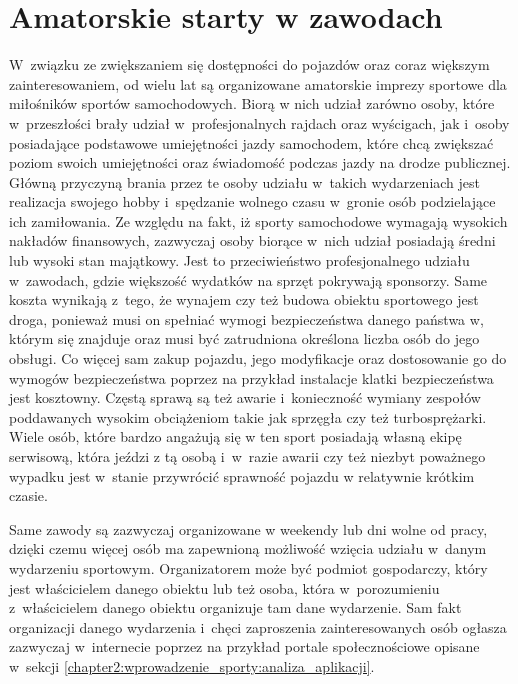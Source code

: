 \documentclass[../Kamil_Kowalewski_Main.tex]{subfiles}
\begin{document}
{    \section{Amatorskie starty w zawodach}
    \label{chapter2:wprowadzenie_sporty:amatorskie} {
        W~związku ze zwiększaniem się dostępności do pojazdów oraz coraz większym
        zainteresowaniem, od wielu lat są organizowane amatorskie imprezy sportowe dla
        miłośników sportów samochodowych. Biorą w nich udział zarówno osoby, które
        w~przeszłości brały udział w~profesjonalnych rajdach oraz wyścigach,
        jak i~osoby posiadające podstawowe umiejętności jazdy samochodem, które chcą
        zwiększać poziom swoich umiejętności oraz świadomość podczas jazdy na drodze
        publicznej. Główną przyczyną brania przez te osoby udziału w~takich wydarzeniach
        jest realizacja swojego hobby i~spędzanie wolnego czasu w~gronie osób
        podzielające ich zamiłowania. Ze względu na fakt, iż sporty samochodowe
        wymagają wysokich nakładów finansowych, zazwyczaj osoby biorące w~nich udział
        posiadają średni lub wysoki stan majątkowy. Jest to przeciwieństwo
        profesjonalnego udziału w~zawodach, gdzie większość wydatków na sprzęt pokrywają
        sponsorzy. Same koszta wynikają z~tego, że wynajem czy też budowa obiektu
        sportowego jest droga, ponieważ musi on spełniać wymogi bezpieczeństwa danego
        państwa w, którym się znajduje oraz musi być zatrudniona określona liczba osób
        do jego obsługi. Co więcej sam zakup pojazdu, jego modyfikacje oraz dostosowanie go
        do wymogów bezpieczeństwa poprzez na przykład instalacje klatki bezpieczeństwa
        jest kosztowny. Częstą sprawą są też awarie i~konieczność wymiany zespołów
        poddawanych wysokim obciążeniom takie jak sprzęgła czy też turbosprężarki. Wiele
        osób, które bardzo angażują się w ten sport posiadają własną ekipę serwisową,
        która jeździ z tą osobą i~w~razie awarii czy też niezbyt poważnego wypadku jest
        w~stanie przywrócić sprawność pojazdu w relatywnie krótkim czasie.

        Same zawody są zazwyczaj organizowane w weekendy lub dni wolne od pracy, dzięki
        czemu więcej osób ma zapewnioną możliwość wzięcia udziału w~danym wydarzeniu
        sportowym. Organizatorem może być podmiot gospodarczy, który jest właścicielem
        danego obiektu lub też osoba, która w~porozumieniu z~właścicielem danego
        obiektu organizuje tam dane wydarzenie. Sam fakt organizacji danego wydarzenia
        i~chęci zaproszenia zainteresowanych osób ogłasza zazwyczaj w~internecie
        poprzez na przykład portale społecznościowe opisane w~sekcji
        \ref{chapter2:wprowadzenie_sporty:analiza_aplikacji}.
    }

}
\end{document}
